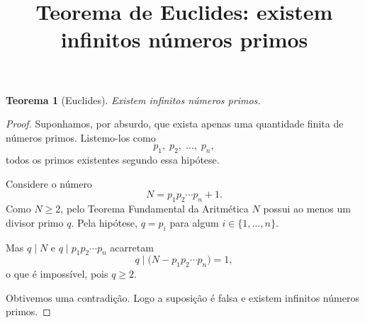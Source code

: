 \documentclass[12pt,a4paper]{article}
\title{Teorema de Euclides: existem infinitos números primos}
\author{}
\date{}
\newtheorem{theorem}{Teorema}[section]
\begin{document}
\maketitle

\begin{theorem}[Euclides]
Existem infinitos números primos.
\end{theorem}

\begin{proof}
Suponhamos, por absurdo, que exista apenas uma quantidade finita de
números primos. Listemo-los como
\[
  p_1,\; p_2,\; \dots,\; p_n,
\]
todos os primos existentes segundo essa hipótese.

Considere o número
\[
  N = p_1 p_2 \cdots p_n + 1.
\]
Como $N \geq 2$, pelo Teorema Fundamental da Aritmética $N$ possui ao
menos um divisor primo $q$. Pela hipótese, $q = p_i$ para algum
$i \in \{1,\dots,n\}$.

Mas $q \mid N$ e $q \mid p_1 p_2 \cdots p_n$ acarretam
\[
  q \mid \bigl(N - p_1 p_2 \cdots p_n\bigr) = 1,
\]
o que é impossível, pois $q \geq 2$.

Obtivemos uma contradição. Logo a suposição é falsa e existem
infinitos números primos.
\end{proof}
\end{document}
